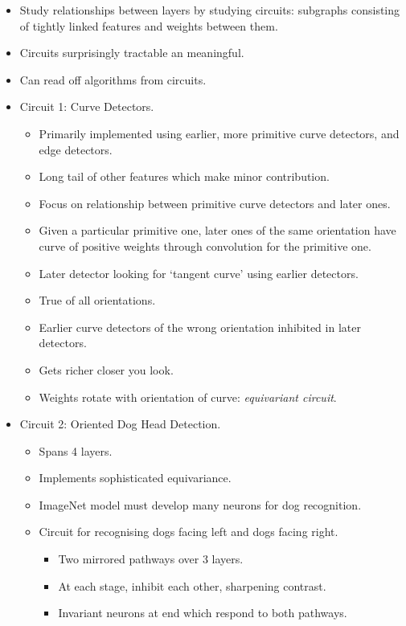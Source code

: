 \begin{itemize}
    \item Study relationships between layers by studying circuits: subgraphs consisting of tightly linked features and weights between them.
    \item Circuits surprisingly tractable an meaningful.
    \item Can read off algorithms from circuits.
    \item Circuit 1: Curve Detectors.
    \begin{itemize}
        \item Primarily implemented using earlier, more primitive curve detectors, and edge detectors.
        \item Long tail of other features which make minor contribution.
        \item Focus on relationship between primitive curve detectors and later ones.
        \item Given a particular primitive one, later ones of the same orientation have curve of positive weights through convolution for the primitive one.
        \item Later detector looking for `tangent curve' using earlier detectors.
        \item True of all orientations.
        \item Earlier curve detectors of the wrong orientation inhibited in later detectors.
        \item Gets richer closer you look.
        \item Weights rotate with orientation of curve: \emph{equivariant circuit}.
    \end{itemize}
    \item Circuit 2: Oriented Dog Head Detection.
    \begin{itemize}
        \item Spans 4 layers.
        \item Implements sophisticated equivariance.
        \item ImageNet model must develop many neurons for dog recognition.
        \item Circuit for recognising dogs facing left and dogs facing right.
        \begin{itemize}
            \item Two mirrored pathways over 3 layers.
            \item At each stage, inhibit each other, sharpening contrast.
            \item Invariant neurons at end which respond to both pathways.

\end{itemize}
\end{itemize}
\end{itemize}
